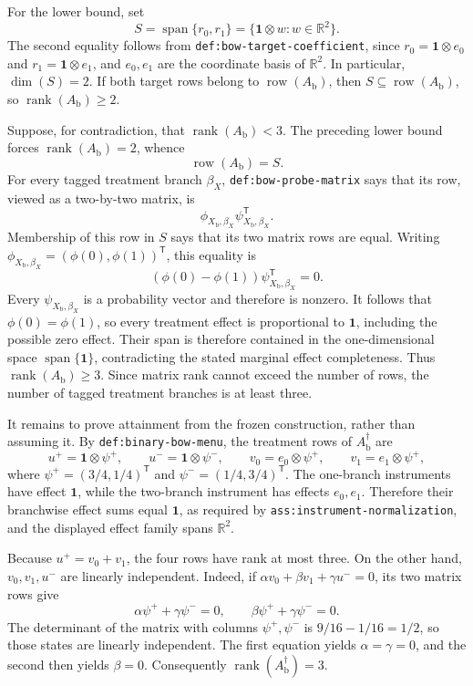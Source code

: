 For the lower bound, set
\[
  S=\operatorname{span}\{r_0,r_1\}
   =\{\mathbf 1\otimes w:w\in\mathbb R^2\}.
\]
The second equality follows from \texttt{def:bow-target-coefficient}, since
\(r_0=\mathbf 1\otimes e_0\) and
\(r_1=\mathbf 1\otimes e_1\), and \(e_0,e_1\) are the coordinate basis of
\(\mathbb R^2\).  In particular, \(\dim(S)=2\).  If both target rows belong
to \(\operatorname{row}(A_{\mathrm b})\), then
\(S\subseteq\operatorname{row}(A_{\mathrm b})\), so
\(\operatorname{rank}(A_{\mathrm b})\geq2\).

Suppose, for contradiction, that
\(\operatorname{rank}(A_{\mathrm b})<3\).  The preceding lower bound forces
\(\operatorname{rank}(A_{\mathrm b})=2\), whence
\[
  \operatorname{row}(A_{\mathrm b})=S.
\]
For every tagged treatment branch \(\beta_X\),
\texttt{def:bow-probe-matrix} says that its row, viewed as a two-by-two matrix,
is
\[
  \phi_{X_{\mathrm b},\beta_X}
  \psi_{X_{\mathrm b},\beta_X}^{\mathsf T}.
\]
Membership of this row in \(S\) says that its two matrix rows are equal.
Writing \(\phi_{X_{\mathrm b},\beta_X}=(\phi(0),\phi(1))^{\mathsf T}\), this
equality is
\[
  (\phi(0)-\phi(1))
  \psi_{X_{\mathrm b},\beta_X}^{\mathsf T}=0.
\]
Every \(\psi_{X_{\mathrm b},\beta_X}\) is a probability vector and therefore
is nonzero.  It follows that \(\phi(0)=\phi(1)\), so every treatment effect is
proportional to \(\mathbf 1\), including the possible zero effect.  Their
span is therefore contained in the one-dimensional space
\(\operatorname{span}\{\mathbf 1\}\), contradicting the stated marginal
effect completeness.  Thus
\(\operatorname{rank}(A_{\mathrm b})\geq3\).  Since matrix rank cannot exceed
the number of rows, the number of tagged treatment branches is at least
three.

It remains to prove attainment from the frozen construction, rather than
assuming it.  By \texttt{def:binary-bow-menu}, the treatment rows of
\(A_{\mathrm b}^{\dagger}\) are
\[
 u^{+}=\mathbf 1\otimes\psi^{+},\qquad
 u^{-}=\mathbf 1\otimes\psi^{-},\qquad
 v_0=e_0\otimes\psi^{+},\qquad
 v_1=e_1\otimes\psi^{+},
\]
where
\(\psi^{+}=(3/4,1/4)^{\mathsf T}\) and
\(\psi^{-}=(1/4,3/4)^{\mathsf T}\).  The one-branch instruments have effect
\(\mathbf 1\), while the two-branch instrument has effects \(e_0,e_1\).
Therefore their branchwise effect sums equal \(\mathbf 1\), as required by
\texttt{ass:instrument-normalization}, and the displayed effect family spans
\(\mathbb R^2\).

Because \(u^{+}=v_0+v_1\), the four rows have rank at most three.  On the
other hand, \(v_0,v_1,u^{-}\) are linearly independent.  Indeed, if
\(\alpha v_0+\beta v_1+\gamma u^{-}=0\), its two matrix rows give
\[
  \alpha\psi^{+}+\gamma\psi^{-}=0,
  \qquad
  \beta\psi^{+}+\gamma\psi^{-}=0.
\]
The determinant of the matrix with columns \(\psi^{+},\psi^{-}\) is
\(9/16-1/16=1/2\), so those states are linearly independent.  The first
equation yields \(\alpha=\gamma=0\), and the second then yields \(\beta=0\).
Consequently
\(\operatorname{rank}(A_{\mathrm b}^{\dagger})=3\).

